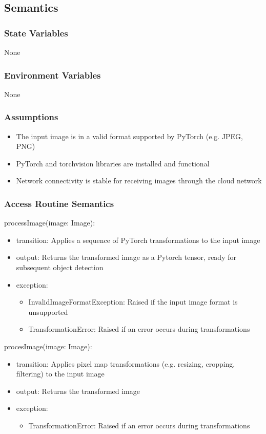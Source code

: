 \documentclass[12pt, titlepage]{article}
\begin{document}
\subsection{Semantics}

\subsubsection{State Variables}
None



\subsubsection{Environment Variables}
None

\subsubsection{Assumptions}
\begin{itemize}
  \item The input image is in a valid format supported by PyTorch (e.g. JPEG, PNG)
  \item PyTorch and torchvision libraries are installed and functional
  \item Network connectivity is stable for receiving images through the cloud network
\end{itemize}


\subsubsection{Access Routine Semantics}

\noindent processImage(image: Image):
\begin{itemize}
\item transition: Applies a sequence of PyTorch transformations to the input image 
\item output: Returns the transformed image as a Pytorch tensor, ready for subsequent object detection
\item exception: 
\begin{itemize}
  \item InvalidImageFormatException: Raised if the input image format is unsupported
  \item TransformationError: Raised if an error occurs during transformations
\end{itemize}

\end{itemize}
\noindent procesImage(image: Image):
\begin{itemize}
  \item transition: Applies pixel map transformations (e.g. resizing, cropping, filtering) to the input image
  \item output: Returns the transformed image
  \item exception: 
  \begin{itemize}
    \item TransformationError: Raised if an error occurs during transformations
  \end{itemize}
  
  \end{itemize}
\end{document}
